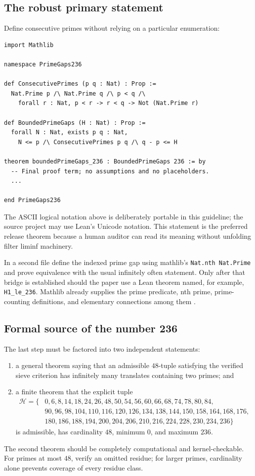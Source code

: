 \documentclass[11pt]{article}
\newcommand{\leanname}[1]{\texttt{#1}}
\begin{document}
\subsection{The robust primary statement}

Define consecutive primes without relying on a particular enumeration:

\begin{lstlisting}
import Mathlib

namespace PrimeGaps236

def ConsecutivePrimes (p q : Nat) : Prop :=
  Nat.Prime p /\ Nat.Prime q /\ p < q /\
    forall r : Nat, p < r -> r < q -> Not (Nat.Prime r)

def BoundedPrimeGaps (H : Nat) : Prop :=
  forall N : Nat, exists p q : Nat,
    N <= p /\ ConsecutivePrimes p q /\ q - p <= H

theorem boundedPrimeGaps_236 : BoundedPrimeGaps 236 := by
  -- Final proof term; no assumptions and no placeholders.
  ...

end PrimeGaps236
\end{lstlisting}

The ASCII logical notation above is deliberately portable in this guideline;
the source project may use Lean's Unicode notation.  This statement is the
preferred release theorem because a human auditor can read its meaning without
unfolding filter liminf machinery.

In a second file define the indexed prime gap using mathlib's
\leanname{Nat.nth Nat.Prime} and prove equivalence with the usual infinitely
often statement.  Only after that bridge is established should the paper use a
Lean theorem named, for example,
\leanname{H1\_le\_236}.  Mathlib already supplies the prime predicate, nth
prime, prime-counting definitions, and elementary connections among them
\cite{MathlibPrimeCounting}.

\subsection{Formal source of the number 236}

The last step must be factored into two independent statements:
\begin{enumerate}
\item a general theorem saying that an admissible \(48\)-tuple satisfying the
  verified sieve criterion has infinitely many translates containing two
  primes; and
\item a finite theorem that the explicit tuple
\[
\begin{split}
\mathcal H=\{&0,6,8,14,18,24,26,48,50,54,56,60,66,68,74,78,80,84,\\
&90,96,98,104,110,116,120,126,134,138,144,150,158,164,168,176,\\
&180,186,188,194,200,204,206,210,216,224,228,230,234,236\}
\end{split}
\]
is admissible, has cardinality \(48\), minimum \(0\), and maximum \(236\).
\end{enumerate}
The second theorem should be completely computational and kernel-checkable.
For primes at most \(48\), verify an omitted residue; for larger primes,
cardinality alone prevents coverage of every residue class.
\end{document}

